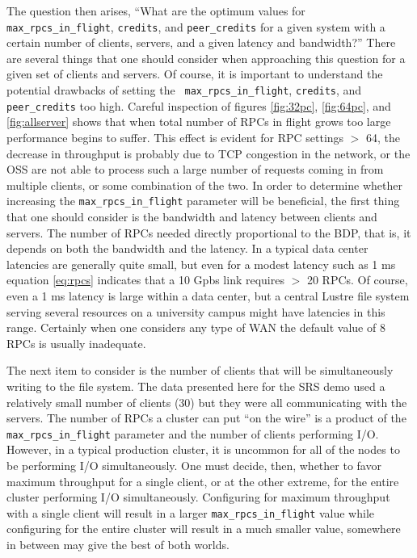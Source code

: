 \documentclass[]{sigplan-proc}
\begin{document}
The question then arises, ``What are the optimum values for {\tt max\_rpcs\_in\_flight}, {\tt credits}, and
{\tt peer\_credits} for a given system with a certain number of clients, servers, and a given latency and
bandwidth?'' There are several things that one should consider when approaching this question for a given set
of clients and servers. Of course, it is important to understand the potential drawbacks of setting the {\tt
  max\_rpcs\_in\_flight}, {\tt credits}, and {\tt peer\_credits} too high. Careful inspection of figures
\ref{fig:32pc}, \ref{fig:64pc}, and \ref{fig:allserver} shows that when total number of RPCs in flight grows
too large performance begins to suffer. This effect is evident for RPC settings $>$ 64, the decrease in
throughput is probably due to TCP congestion in the network, or the OSS are not able to process such a large
number of requests coming in from multiple clients, or some combination of the two. In order to determine
whether increasing the {\tt max\_rpcs\_in\_flight} parameter will be beneficial, the first thing that one
should consider is the bandwidth and latency between clients and servers. The number of RPCs needed directly
proportional to the BDP, that is, it depends on both the bandwidth and the latency. In a typical data center
latencies are generally quite small, but even for a modest latency such as 1 ms equation \ref{eq:rpcs}
indicates that a 10 Gpbs link requires $>$ 20 RPCs. Of course, even a 1 ms latency is large within a data
center, but a central Lustre file system serving several resources on a university campus might have latencies
in this range. Certainly when one considers any type of WAN the default value of 8 RPCs is usually inadequate.

The next item to consider is the number of clients that will be simultaneously writing to the file system. The
data presented here for the SRS demo used a relatively small number of clients (30) but they were all
communicating with the servers. The number of RPCs a cluster can put ``on the wire'' is a product of the {\tt
  max\_rpcs\_in\_flight} parameter and the number of clients performing I/O. However, in a typical production
cluster, it is uncommon for all of the nodes to be performing I/O simultaneously.  One must decide, then,
whether to favor maximum throughput for a single client, or at the other extreme, for the entire cluster
performing I/O simultaneously. Configuring for maximum throughput with a single client will result in a larger
{\tt max\_rpcs\_in\_flight} value while configuring for the entire cluster will result in a much smaller
value, somewhere in between may give the best of both worlds.
\end{document}
